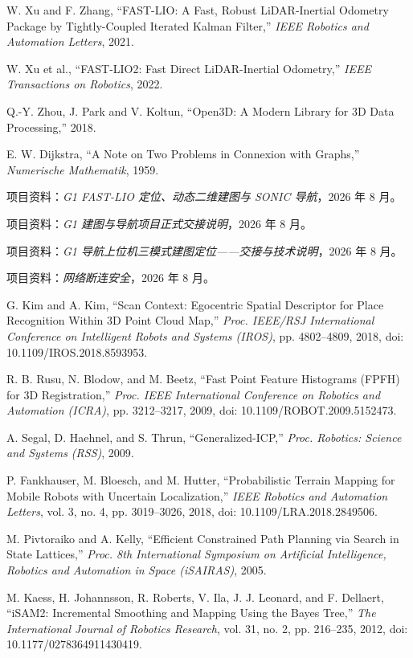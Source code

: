 \documentclass[11pt,a4paper,fontset=none]{ctexart}
\begin{document}
\begin{enumerate}[label={[\arabic*]}]
  \item W. Xu and F. Zhang, ``FAST-LIO: A Fast, Robust LiDAR-Inertial Odometry Package by Tightly-Coupled Iterated Kalman Filter,'' \emph{IEEE Robotics and Automation Letters}, 2021.
  \item W. Xu et al., ``FAST-LIO2: Fast Direct LiDAR-Inertial Odometry,'' \emph{IEEE Transactions on Robotics}, 2022.
  \item Q.-Y. Zhou, J. Park and V. Koltun, ``Open3D: A Modern Library for 3D Data Processing,'' 2018.
  \item E. W. Dijkstra, ``A Note on Two Problems in Connexion with Graphs,'' \emph{Numerische Mathematik}, 1959.
  \item 项目资料：\emph{G1 FAST-LIO 定位、动态二维建图与 SONIC 导航}，2026 年 8 月。
  \item 项目资料：\emph{G1 建图与导航项目正式交接说明}，2026 年 8 月。
  \item 项目资料：\emph{G1 导航上位机三模式建图定位——交接与技术说明}，2026 年 8 月。
  \item 项目资料：\emph{网络断连安全}，2026 年 8 月。
  \item G. Kim and A. Kim, ``Scan Context: Egocentric Spatial Descriptor for Place Recognition Within 3D Point Cloud Map,'' \emph{Proc. IEEE/RSJ International Conference on Intelligent Robots and Systems (IROS)}, pp. 4802--4809, 2018, doi: 10.1109/IROS.2018.8593953.
  \item R. B. Rusu, N. Blodow, and M. Beetz, ``Fast Point Feature Histograms (FPFH) for 3D Registration,'' \emph{Proc. IEEE International Conference on Robotics and Automation (ICRA)}, pp. 3212--3217, 2009, doi: 10.1109/ROBOT.2009.5152473.
  \item A. Segal, D. Haehnel, and S. Thrun, ``Generalized-ICP,'' \emph{Proc. Robotics: Science and Systems (RSS)}, 2009.
  \item P. Fankhauser, M. Bloesch, and M. Hutter, ``Probabilistic Terrain Mapping for Mobile Robots with Uncertain Localization,'' \emph{IEEE Robotics and Automation Letters}, vol. 3, no. 4, pp. 3019--3026, 2018, doi: 10.1109/LRA.2018.2849506.
  \item M. Pivtoraiko and A. Kelly, ``Efficient Constrained Path Planning via Search in State Lattices,'' \emph{Proc. 8th International Symposium on Artificial Intelligence, Robotics and Automation in Space (iSAIRAS)}, 2005.
  \item M. Kaess, H. Johannsson, R. Roberts, V. Ila, J. J. Leonard, and F. Dellaert, ``iSAM2: Incremental Smoothing and Mapping Using the Bayes Tree,'' \emph{The International Journal of Robotics Research}, vol. 31, no. 2, pp. 216--235, 2012, doi: 10.1177/0278364911430419.

\end{enumerate}
\end{document}
